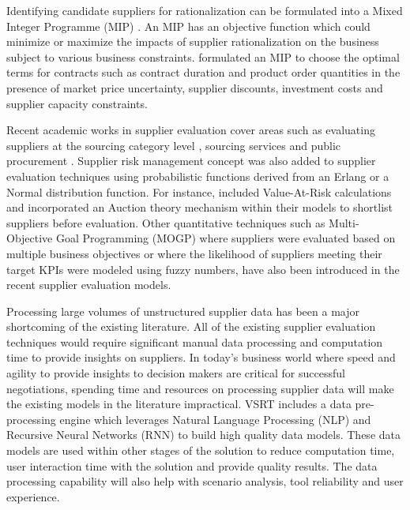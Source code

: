 \documentclass[inte,nonblindrev]{informs3} %
\begin{document}
Identifying candidate suppliers for rationalization can be formulated into a Mixed Integer Programme (MIP) \citep{r34}. An MIP has an objective function which could minimize or maximize the impacts of supplier rationalization on the business subject to various business constraints. \cite{r32} formulated an MIP to choose the optimal terms for contracts such as contract duration and product order quantities in the presence of market price uncertainty, supplier discounts, investment costs and supplier capacity constraints.

Recent academic works in supplier evaluation cover areas such as evaluating suppliers at the sourcing category level \citep{r22}, sourcing services \citep{r23} and public procurement \citep{r24}. Supplier risk management concept \citep{r27} was also added to supplier evaluation techniques using probabilistic functions derived from an Erlang or a Normal distribution function. For instance, \cite{r28} included Value-At-Risk calculations and \cite{r29} incorporated an Auction theory mechanism within their models to shortlist suppliers before evaluation. Other quantitative techniques such as Multi-Objective Goal Programming (MOGP) \citep{r31} where suppliers were evaluated based on multiple business objectives or \citep{r30} where the likelihood of suppliers meeting their target KPIs were modeled using fuzzy numbers, have also been introduced in the recent supplier evaluation models.

Processing large volumes of unstructured supplier data has been a major shortcoming of the existing literature. All of the existing supplier evaluation techniques would require significant manual data processing and computation time to provide insights on suppliers. In today's business world where speed and agility to provide insights to decision makers are critical for successful negotiations, spending time and resources on processing supplier data will make the existing models in the literature impractical. VSRT includes a data pre-processing engine which leverages Natural Language Processing (NLP) \citep{r10} and Recursive Neural Networks (RNN) \citep{r5} to build high quality data models. These data models are used within other stages of the solution to reduce computation time, user interaction time with the solution and provide quality results. The data processing capability will also help with scenario analysis, tool reliability and user experience.  
\end{document}
